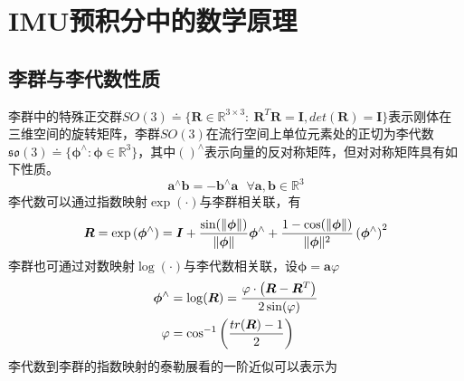


\chapter{IMU预积分中的数学原理}

\section{李群与李代数性质}

李群中的特殊正交群$SO(3) \doteq \{ \boldsymbol{R} \in \mathds{R}^{3 \times 3}:\ \boldsymbol{R}^T \boldsymbol{R}=\boldsymbol{I},det(\boldsymbol{R})=\boldsymbol{I} \}$表示刚体在三维空间的旋转矩阵，李群$SO(3)$在流行空间上单位元素处的正切为李代数$\mathfrak{so}(3) \doteq \{ \boldsymbol{\phi}^\wedge: \boldsymbol{\phi} \in  \mathds{R}^3  \}$，其中$()^\wedge$表示向量的反对称矩阵，但对对称矩阵具有如下性质。
\begin{equation}
\boldsymbol{a}^\wedge \boldsymbol{b} = - \boldsymbol{b}^\wedge \boldsymbol{a} \ \ \ \forall \boldsymbol{a},\boldsymbol{b} \in \mathds{R}^3
\end{equation}
李代数可以通过指数映射$\exp(\cdot)$与李群相关联，有
\begin{equation}
\label{equ1}
\boldsymbol{R} = \exp \left( \boldsymbol{\phi}^\wedge \right) = \boldsymbol{I}+{ \sin( \Vert \boldsymbol{\phi} \Vert) \over \Vert \boldsymbol{\phi} \Vert } \boldsymbol{\phi}^{\wedge} + { {1-\cos(\Vert \boldsymbol{\phi} \Vert)} \over \Vert \boldsymbol{\phi} \Vert^2 }\left(\boldsymbol{\phi}^{\wedge}\right)^2
\end{equation}
李群也可通过对数映射$\log(\cdot)$与李代数相关联，设$\boldsymbol{\phi} = \boldsymbol{a} \varphi$
\begin{equation}
\label{equ2}
\begin{aligned}
\boldsymbol{\phi}^{\wedge} &= \log(\boldsymbol{R}) = { \varphi \cdot \left(\boldsymbol{R} - \boldsymbol{R}^T \right)  \over 2 \sin(\varphi) }
\\
\varphi &= \cos^{-1} \left( tr(\boldsymbol{R})-1 \over 2 \right)
\end{aligned}
\end{equation}
李代数到李群的指数映射的泰勒展看的一阶近似可以表示为

